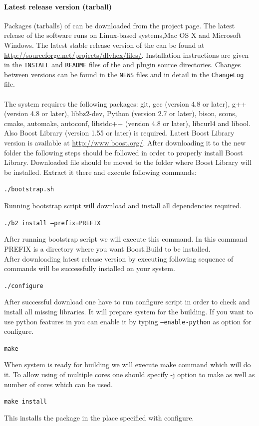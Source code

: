 \documentclass[14pt,a4paper, titlepage]{article}
\begin{document}
\paragraph{Latest release version (tarball)}
Packages (tarballs) of \dlvhex{} can be downloaded from the project page\cite{sourceforge}. The latest release of the software runs on Linux-based systems,Mac OS X and Microsoft Windows. The latest stable release version of the \dlvhex{} can be found at \url{http://sourceforge.net/projects/dlvhex/files/}. Installation instructions are given in the {\tt INSTALL} and {\tt README} files of the \dlvhex{} and plugin source directories. Changes between versions can be found in the {\tt NEWS} files and in detail in the {\tt ChangeLog} file. \\ \\The system requires the following packages: git, gcc (version 4.8 or later), g++ (version 4.8 or later), libbz2-dev, Python (version 2.7 or later), bison, scons, cmake, automake, autoconf, libstdc++ (version 4.8 or later), libcurl4 and libool. Also Boost Library (version 1.55 or later) is required. Latest Boost Library version is available at \url{http://www.boost.org/}. After downloading it to the new folder the following steps should be followed in order to properly install Boost Library. Downloaded file should be moved to the folder where Boost Library will be installed. Extract it there and execute following commands:
\\ \centerline{\texttt{./bootstrap.sh}}
Running bootstrap script will download and install all dependencies required.
\centerline{\texttt{./b2 install --prefix=PREFIX}} After running bootstrap script we will execute this command. In this command PREFIX is a directory where you want Boost.Build to be installed.
\\ After downloading latest release version by executing following sequence of commands \dlvhex{} will be successfully installed on your system.
\\ \centerline{\texttt{./configure}} After successful download one have to run configure script in order to check and install all missing libraries. It will prepare system for the building. If you want to use python features in \dlvhex you can enable it by typing \texttt{--enable-python} as option for configure.
\\ \centerline{\texttt{make}} When system is ready for building we will execute make command which will do it. To allow using of multiple cores one should specify -j option to make as well as number of cores which can be used.
\\ \centerline{\texttt{make install}} This installs the package in the place specified with configure.  
   
\end{document}
